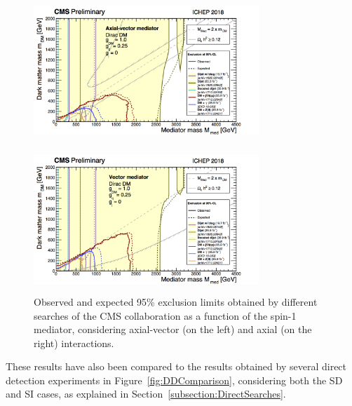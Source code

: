 \documentclass[a4paper, 10pt, openright]{report}
\begin{document}
\begin{figure}[htbp]
\centering
\begin{minipage}[b]{.47\textwidth}
\includegraphics[width=8.5cm, height=5.5cm]{figs/SummaryAxialVector.png}
\end{minipage}\hfill
\begin{minipage}[b]{.47\textwidth}
\includegraphics[width=8.5cm, height=5.5cm]{figs/SummaryVector.png}
\end{minipage} \hfill
\caption{Observed and expected 95\% exclusion limits obtained by different searches of the \ac{CMS} collaboration as a function of the spin-1 mediator, considering axial-vector (on the left) and axial (on the right) interactions.}
\label{fig:SummarySpin1}
\end{figure}

These results have also been compared to the results obtained by several direct detection experiments in Figure~\ref{fig:DDComparison}, considering both the \acf{SD} and \acf{SI} cases, as explained in Section~\ref{subsection:DirectSearches}.
\end{document}
